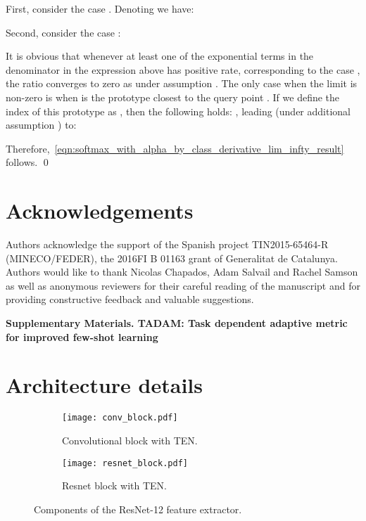 \documentclass{article}
\begin{document}
First, consider the case . Denoting  we have:

Second, consider the case  :

It is obvious that whenever at least one of the exponential terms in the denominator in the expression above has positive rate, corresponding to the case , the ratio converges to zero as   under assumption . The only case when the limit is non-zero is when  is the prototype closest to the query point . If we define the index of this prototype as , then the following holds: , leading (under additional assumption ) to:

Therefore,~\eqref{eqn:softmax_with_alpha_by_class_derivative_lim_infty_result} follows. \qed

\section*{Acknowledgements}
Authors acknowledge the support of the Spanish project TIN2015-65464-R (MINECO/FEDER), the 2016FI B 01163 grant of Generalitat de Catalunya. Authors would like to thank Nicolas Chapados, Adam Salvail and Rachel Samson as well as anonymous reviewers for their careful reading of the manuscript and for providing constructive feedback and valuable suggestions.









\newpage
\pagebreak
\begin{center}
\textbf{\large Supplementary Materials. TADAM: Task dependent adaptive metric for improved few-shot learning}
\end{center}
\setcounter{equation}{0}
\setcounter{figure}{0}
\setcounter{table}{0}
\setcounter{page}{1}
\setcounter{section}{0}
\makeatletter
\gdef\thesection{S\@arabic\c@section}



\section{Architecture details} \label{ssec:components_of_architecture}

\begin{figure}[h]
    \centering
    \begin{subfigure}[t]{0.35\textwidth}
        \centering
        \texttt{[image: conv\_block.pdf]}
        \caption{Convolutional block with TEN.}
        \label{fig:conv_block}
    \end{subfigure} \hspace{0.15\textwidth}
    \begin{subfigure}[t]{0.3\textwidth}
        \centering
        \texttt{[image: resnet\_block.pdf]}
        \caption{Resnet block with TEN.}
        \label{fig:resnet_block}
    \end{subfigure}
    \caption{Components of the ResNet-12 feature extractor.}
    \label{fig:ten_resnet_details}
\end{figure}
\end{document}
